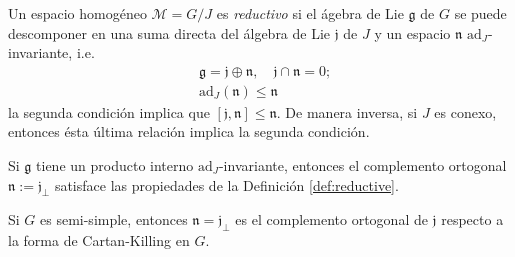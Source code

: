 \begin{mydef} \cite{Borel}
\label{def:reductive}
Un espacio homog\'{e}neo $\mathcal{M} = G/J$ es \emph{reductivo} si el \'{a}gebra de Lie $\mathfrak{g}$ de $G$ se puede descomponer en una suma directa del \'{a}lgebra de Lie $\mathfrak{j}$ de $J$ y un espacio $\mathfrak{n}$ $\mathrm{ad}_{J}$-invariante, i.e.
%
\begin{align*}
& \mathfrak{g} = \mathfrak{j} \oplus \mathfrak{n}, \quad  \mathfrak{j} \cap \mathfrak{n} = 0; \\
& \mathrm{ad}_{J}(\mathfrak{n}) \leq \mathfrak{n}
\end{align*}
%
la segunda condici\'{o}n implica que $[\mathfrak{j}, \mathfrak{n}] \leq \mathfrak{n}$. De manera inversa, si $J$ es conexo, entonces \'{e}sta \'{u}ltima relaci\'{o}n implica la segunda condici\'{o}n.
\end{mydef}

\begin{obs}
Si $\mathfrak{g}$ tiene un producto interno $\mathrm{ad}_{J}$-invariante, entonces el complemento ortogonal $\mathfrak{n} := \mathfrak{j}_{\perp}$ satisface las propiedades de la Definici\'{o}n \ref{def:reductive}.
\end{obs}

\begin{obs}
Si $G$ es semi-simple, entonces $\mathfrak{n} = \mathfrak{j}_{\perp}$ es el complemento ortogonal de $\mathfrak{j}$ respecto a la forma de Cartan-Killing en $G$.
\end{obs}